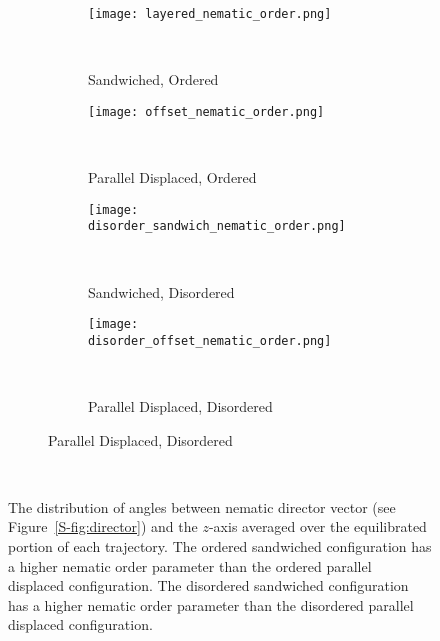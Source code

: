   \begin{figure}[!htb]
  \begin{subfigure}{\linewidth}
        \centering
        \begin{subfigure}{0.45\linewidth}
                \centering
                \texttt{[image: layered\_nematic\_order.png]}
                \caption{Sandwiched, Ordered}~\label{S-fig:sandwich_nematic}
        \end{subfigure}%
        \begin{subfigure}{0.45\linewidth}
                \centering
                \texttt{[image: offset\_nematic\_order.png]}
                \caption{Parallel Displaced, Ordered}~\label{S-fig:offset_nematic}
        \end{subfigure}
        \begin{subfigure}{0.45\linewidth}
                \centering
                \texttt{[image: disorder\_sandwich\_nematic\_order.png]}
                \caption{Sandwiched, Disordered}~\label{S-fig:disorder_sandwich_nematic}
        \end{subfigure}%
        \begin{subfigure}{0.45\linewidth}
                \centering
                \texttt{[image: disorder\_offset\_nematic\_order.png]}
                \caption{Parallel Displaced, Disordered}~\label{S-fig:disorder_offset_nematic}
        \end{subfigure}
  \end{subfigure}
  \caption{The distribution of angles between nematic director vector (see
	  Figure~\ref{S-fig:director}) and the $z$-axis averaged over the equilibrated portion
	  of each trajectory. The ordered sandwiched configuration has a higher nematic order
	  parameter than the ordered parallel displaced configuration. The disordered
	  sandwiched configuration has a higher nematic order parameter than the 
	  disordered parallel displaced configuration.}~\label{S-fig:nematic_distribution}
  \end{figure}

